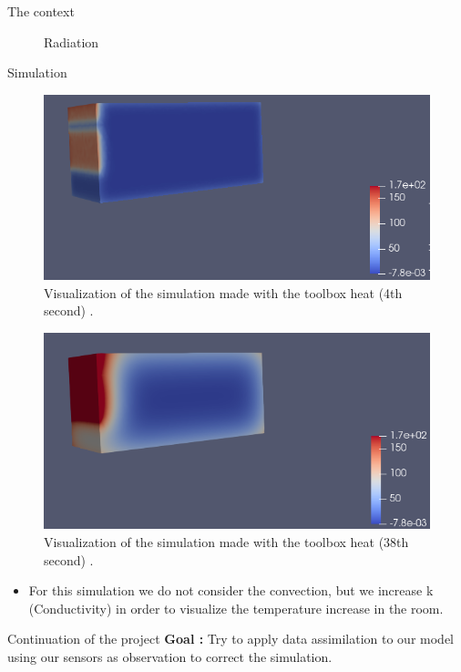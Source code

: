 \begin{frame}[allowframebreaks]{The context}
\begin{minipage}{0.35\linewidth}
\begin{figure}
        \caption{Radiation}
    \end{figure}
\end{minipage}

\end{frame}
\begin{frame}[allowframebreaks]{Simulation}
\begin{minipage}{0.48\linewidth}
    \begin{figure}
        \centering
        \includegraphics[width=\linewidth]{"images/enkf/Simulation_1.jpg"}
        \caption{Visualization of the simulation made with the toolbox heat (4th second) .}
    \end{figure}
\end{minipage} \;
\begin{minipage}{0.46\linewidth}
    \begin{figure}
        \centering
        \includegraphics[width=\linewidth]{"images/enkf/Simulation_2.jpg"}
        \caption{Visualization of the simulation made with the toolbox heat (38th second) .}
    \end{figure}
\end{minipage}
\begin{itemize}
    \item For this simulation we do not consider the convection, but we increase k (Conductivity) in order to visualize the temperature increase in the room.
\end{itemize}

\end{frame}
    
\begin{frame}{Continuation of the project}
	\textbf{Goal :} Try to apply data assimilation to our model using our sensors as observation to correct the simulation.
\end{frame}



